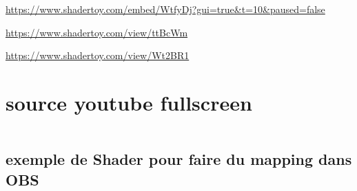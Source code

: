 \documentclass[
  french,
]{book}
\begin{document}
\url{https://www.shadertoy.com/embed/WtfyDj?gui=true\&t=10\&paused=false}

\url{https://www.shadertoy.com/view/ttBcWm}

\url{https://www.shadertoy.com/view/Wt2BR1}

\hypertarget{source-youtube-fullscreen}{%
\section{source youtube fullscreen}\label{source-youtube-fullscreen}}

\begin{verbatim}
\end{verbatim}

\hypertarget{exemple-de-shader-pour-faire-du-mapping-dans-obs}{%
\subsection{exemple de Shader pour faire du mapping dans OBS}\label{exemple-de-shader-pour-faire-du-mapping-dans-obs}}
\end{document}
